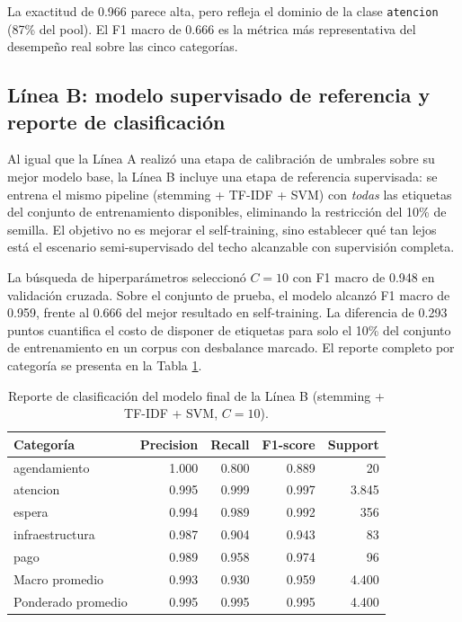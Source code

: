 \documentclass[12pt,a4paper]{article}
\newcommand{\code}[1]{\nolinkurl{#1}}
\begin{document}
La exactitud de 0.966 parece alta, pero refleja el dominio de la clase \code{atencion} (87\% del pool). El F1 macro de 0.666 es la métrica más representativa del desempeño real sobre las cinco categorías.

\subsection{Línea B: modelo supervisado de referencia y reporte de clasificación}

Al igual que la Línea A realizó una etapa de calibración de umbrales sobre su mejor modelo base, la Línea B incluye una etapa de referencia supervisada: se entrena el mismo pipeline (stemming + TF-IDF + SVM) con \emph{todas} las etiquetas del conjunto de entrenamiento disponibles, eliminando la restricción del 10\% de semilla. El objetivo no es mejorar el self-training, sino establecer qué tan lejos está el escenario semi-supervisado del techo alcanzable con supervisión completa.

La búsqueda de hiperparámetros seleccionó $C=10$ con F1 macro de 0.948 en validación cruzada. Sobre el conjunto de prueba, el modelo alcanzó F1 macro de 0.959, frente al 0.666 del mejor resultado en self-training. La diferencia de 0.293 puntos cuantifica el costo de disponer de etiquetas para solo el 10\% del conjunto de entrenamiento en un corpus con desbalance marcado. El reporte completo por categoría se presenta en la Tabla \ref{tab:reporte_linea_b}.

\begin{table}[htbp]
\centering
\caption{Reporte de clasificación del modelo final de la Línea B (stemming + TF-IDF + SVM, $C=10$).}
\label{tab:reporte_linea_b}
\small
\begin{tabular}{lrrrr}
\toprule
\textbf{Categoría} & \textbf{Precision} & \textbf{Recall} & \textbf{F1-score} & \textbf{Support} \\
\midrule
agendamiento     & 1.000 & 0.800 & 0.889 & 20 \\
atencion         & 0.995 & 0.999 & 0.997 & 3.845 \\
espera           & 0.994 & 0.989 & 0.992 & 356 \\
infraestructura  & 0.987 & 0.904 & 0.943 & 83 \\
pago             & 0.989 & 0.958 & 0.974 & 96 \\
\midrule
Macro promedio     & 0.993 & 0.930 & 0.959 & 4.400 \\
Ponderado promedio & 0.995 & 0.995 & 0.995 & 4.400 \\
\bottomrule
\end{tabular}
\end{table}
\FloatBarrier
\end{document}
